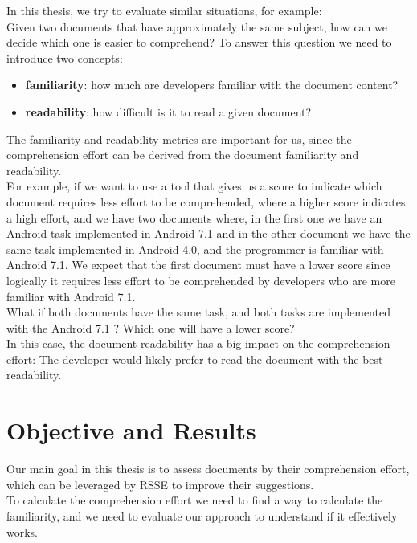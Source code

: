 \documentclass[12pt,mscthesis]{usiinfthesis}
\begin{document}
	In this thesis, we try to evaluate similar situations, for example:\\
	Given two documents that have approximately the same subject, how can we decide which one is easier to comprehend? To answer this question we need to introduce two concepts:
	\begin{itemize}
	\item \textbf{familiarity}: how much are developers familiar with the document content?
	\item \textbf{readability}: how difficult is it to read a given document?
	\end{itemize}
	The familiarity and readability metrics are important for us, since the comprehension effort can be derived from the document familiarity and readability.\\
	For example, if we want to use a tool that gives us a score to indicate which document requires less effort to be comprehended, where a higher score indicates a high effort, and we have two documents where, in the first one we have an Android task implemented in Android 7.1 and in the other document we have the same task implemented in Android 4.0, and the programmer is familiar with Android 7.1.
	We expect that the first document must have a lower score since logically it requires less effort to be comprehended by developers who are more familiar with Android 7.1.\\
	What if both documents have the same task, and both tasks are implemented with the Android 7.1 ? Which one will have a lower score? \\
	In this case, the document readability has a big impact on the comprehension effort: The developer would likely prefer to read the document with the best readability.\\
	
	\section{Objective and Results}
	Our main goal in this thesis is to assess documents by their comprehension effort, which can be leveraged by RSSE to improve their suggestions.\\
	To calculate the comprehension effort we need to find a way to calculate the familiarity, and we need to evaluate our approach to understand if it effectively works.\\
\end{document}
